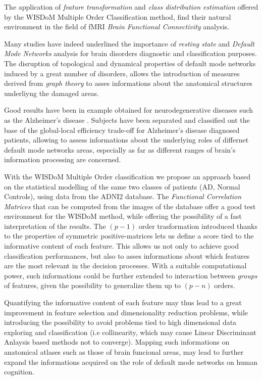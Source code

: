 \documentclass[12pt,openright,twoside,a4paper]{book}
\begin{document}
The application of \textit{feature transformation} and \textit{class distribution estimation} offered by the WISDoM Multiple Order Classification method, find their natural environment in the field of fMRI \textit{Brain Functional Connectivity} analysis.

Many studies have indeed underlined the importance of \textit{resting state} and \textit{Default Mode Networks} analysis for brain disorders diagnostic and classification purposes.
The disruption of topological and dynamical properties of default mode networks induced by a great number of disorders, allows the introduction of measures derived from \textit{graph theory} to asses informations about the anatomical structures underliyng the damaged areas.

Good results have been in example obtained for neurodegenerative diseases such as the Alzheimer's disease \cite{ssa}.
Subjects have been separated and classified ont the base of the global-local efficiency trade-off for Alzheimer's disease diagnosed patients, allowing to assess informations about the underlying roles of differnet default mode networks areas, especially as far as different ranges of brain's information processing are concerned.

With the WISDoM Multiple Order classification  we propose an approach based on the statistical modelling of the same two classes of patients (AD, Normal Controls), using data from the ADNI2 database. 
The \textit{Functional Correlation Matrices} that can be computed from the images of the database offer a good test environment for the WISDoM method, while offering the possibility of a fast interpretation of the results. 
The $(p-1)$ order trasformation introduced thanks to the properties of symmetric positive-matrices lets us define a score tied to the informative content of each feature.
This allows us not only to achieve good classification performances, but also to asses informations about which features are the most relevant in the decision processes.
With a suitable computational power, such informations could be further extended to interaction between \textit{groups} of features, given the possibility to generalize them up to $(p-n)$ orders.

Quantifying the informative content of each feature may thus lead to a great improvement in feature selection and dimensionality reduction problems, while introducing the possibility to avoid problems tied to high dimensional data exploring and classification (i.e collinearity, which may cause Linear Discriminant Anlaysis based methods not to converge).
Mapping such informations on anatomical atlases  such as those of brain funcional areas, may lead to further expand the informations acquired on the role of default mode networks on human cognition.
\end{document}
